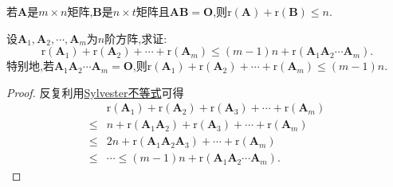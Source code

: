 \documentclass[../../main.tex]{subfiles}%
\begin{document}
\begin{corollary}\label{corollary:矩阵的秩不等式1}
若\(\boldsymbol{A}\)是\(m\times n\)矩阵,\(\boldsymbol{B}\)是\(n\times t\)矩阵且\(\boldsymbol{A}\boldsymbol{B}=\boldsymbol{O}\),则\(\mathrm{r}(\boldsymbol{A})+\mathrm{r}(\boldsymbol{B})\leqslant  n\).
\end{corollary}

\begin{proposition}[Sylvester不等式的推广]\label{proposition:Sylvester(西尔维斯特)不等式的推广}
设\(\boldsymbol{A}_1,\boldsymbol{A}_2,\cdots,\boldsymbol{A}_m\)为\(n\)阶方阵,求证:
\[
\mathrm{r}(\boldsymbol{A}_1)+\mathrm{r}(\boldsymbol{A}_2)+\cdots+\mathrm{r}(\boldsymbol{A}_m)\leqslant (m - 1)n+\mathrm{r}(\boldsymbol{A}_1\boldsymbol{A}_2\cdots\boldsymbol{A}_m).
\]
特别地,若\(\boldsymbol{A}_1\boldsymbol{A}_2\cdots\boldsymbol{A}_m=\boldsymbol{O}\),则\(\mathrm{r}(\boldsymbol{A}_1)+\mathrm{r}(\boldsymbol{A}_2)+\cdots+\mathrm{r}(\boldsymbol{A}_m)\leqslant (m - 1)n\).
\end{proposition}
\begin{proof}
反复利用\hyperref[proposition:Sylvester(西尔维斯特)不等式]{Sylvester不等式}可得
\begin{align*}
&\mathrm{r}(\boldsymbol{A}_1)+\mathrm{r}(\boldsymbol{A}_2)+\mathrm{r}(\boldsymbol{A}_3)+\cdots+\mathrm{r}(\boldsymbol{A}_m)\\
\leqslant &n+\mathrm{r}(\boldsymbol{A}_1\boldsymbol{A}_2)+\mathrm{r}(\boldsymbol{A}_3)+\cdots+\mathrm{r}(\boldsymbol{A}_m)\\
\leqslant &2n+\mathrm{r}(\boldsymbol{A}_1\boldsymbol{A}_2\boldsymbol{A}_3)+\cdots+\mathrm{r}(\boldsymbol{A}_m)\\
\leqslant &\cdots\leqslant (m - 1)n+\mathrm{r}(\boldsymbol{A}_1\boldsymbol{A}_2\cdots\boldsymbol{A}_m).
\end{align*}
\end{proof}
\end{document}
